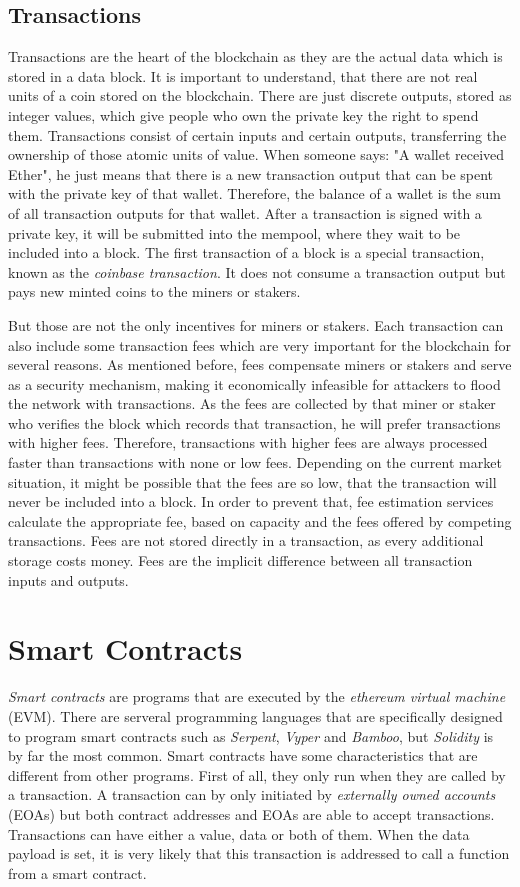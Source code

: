 \subsection{Transactions}
Transactions are the heart of the blockchain as they are the actual data which is stored in a data block. It is important to understand, that there are not real
units of a coin stored on the blockchain. There are just discrete outputs, stored as integer values, which give people who own the private key the right to spend
them. Transactions consist of certain inputs and certain outputs, transferring the ownership of those atomic units of value. When someone says: "A wallet received
Ether", he just means that there is a new transaction output that can be spent with the private key of that wallet. Therefore, the balance of a wallet is the sum of
all transaction outputs for that wallet. After a transaction is signed with a private key, it will be submitted into the mempool, where they wait to be included into
a block. The first transaction of a block is a special transaction, known as the \textit{coinbase transaction}. It does not consume a transaction output but pays new minted coins to the miners or stakers.

But those are not the only incentives for miners or stakers. Each transaction can also include some transaction fees which are very important
for the blockchain for several reasons. As mentioned before, fees compensate miners or stakers and serve as a security mechanism, making it economically infeasible for attackers
to flood the network with transactions. As the fees are collected by that miner or staker who verifies the block which records that transaction, he will prefer transactions with
higher fees. Therefore, transactions with higher fees are always processed faster than transactions with none or low fees. Depending on the current market situation,
it might be possible that the fees are so low, that the transaction will never be included into a block. In order to prevent that, fee estimation services calculate
the appropriate fee, based on capacity and the fees offered by competing transactions. Fees are not stored directly in a transaction, as every additional storage
costs money. Fees are the implicit difference between all transaction inputs and outputs.

\section{Smart Contracts}
\textit{Smart contracts} are programs that are executed by the \textit{ethereum virtual machine} (EVM). There are serveral programming languages that are specifically designed to
program smart contracts such as \textit{Serpent}, \textit{Vyper} and \textit{Bamboo}, but \textit{Solidity} is by far the most common. Smart contracts have some characteristics that are different from
other programs. First of all, they only run when they are called by a transaction. A transaction can by only initiated by \textit{externally owned accounts} (EOAs) but both
contract addresses and EOAs are able to accept transactions. Transactions can have either a value, data or both of them. When the data payload is set, it is very
likely that this transaction is addressed to call a function from a smart contract.

